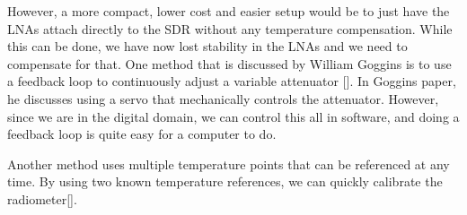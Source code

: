 However, a more compact, lower cost and easier setup would be to just have the LNAs attach directly to the SDR without any temperature compensation.  While this can be done, we have now lost stability in the LNAs and we need to compensate for that.  One method that is discussed by William Goggins is to use a feedback loop to continuously adjust a variable attenuator [\cite{Goggins}].  In Goggins paper, he discusses using a servo that mechanically controls the attenuator.  However, since we are in the digital domain, we can control this all in software, and doing a feedback loop is quite easy for a computer to do.  

Another method uses multiple temperature points that can be referenced at any time.  By using two known temperature references, we can quickly calibrate the radiometer[\cite{Hach}].  


